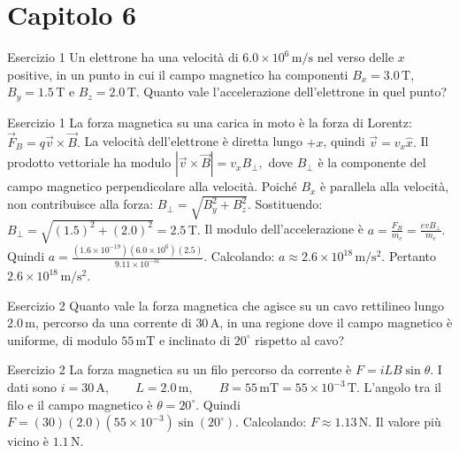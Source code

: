 \documentclass[a4paper]{article}
\begin{document}
\section{Capitolo 6}
\begin{snippetexercise}{Esercizio 1}
    Un elettrone ha una velocità di \(6.0 \times 10^6\,\mathrm{m/s}\) nel
    verso delle \(x\) positive, in un punto in cui il campo magnetico ha
    componenti \(B_x = 3.0\,\mathrm{T}\), \(B_y = 1.5\,\mathrm{T}\) e
    \(B_z = 2.0\,\mathrm{T}\). Quanto vale l'accelerazione dell'elettrone in
    quel punto?

\end{snippetexercise}
\begin{snippetsolution}{Esercizio 1}
    La forza magnetica su una carica in moto è la forza di Lorentz:
    \(\vec{F}_B = q\vec{v}\times\vec{B}.\)
    La velocità dell'elettrone è diretta lungo \(+x\), quindi
    \(\vec{v} = v_x \hat{x}.\)
    Il prodotto vettoriale ha modulo
    \(|\vec{v}\times\vec{B}| = v_x B_{\perp},\)
    dove \(B_{\perp}\) è la componente del campo magnetico perpendicolare alla
    velocità. Poiché \(B_x\) è parallela alla velocità, non contribuisce alla
    forza:
    \(B_{\perp} = \sqrt{B_y^2+B_z^2}.\)
    Sostituendo:
    \(B_{\perp} = \sqrt{(1.5)^2+(2.0)^2} = 2.5\,\mathrm{T}.\)
    Il modulo dell'accelerazione è
    \(a = \frac{F_B}{m_e} = \frac{e v B_{\perp}}{m_e}.\)
    Quindi
    \(a = \frac{ \left(1.6 \times 10^{-19}\right) \left(6.0 \times 10^6\right) (2.5) }{ 9.11 \times 10^{-31} }.\)
    Calcolando:
    \(a \approx 2.6 \times 10^{18}\,\mathrm{m/s^2}.\)
    Pertanto
    \(\boxed{2.6 \times 10^{18}\,\mathrm{m/s^2}}.\)
\end{snippetsolution}
\begin{snippetexercise}{Esercizio 2}
    Quanto vale la forza magnetica che agisce su un cavo rettilineo lungo
    \(2.0\,\mathrm{m}\), percorso da una corrente di \(30\,\mathrm{A}\), in una
    regione dove il campo magnetico è uniforme, di modulo \(55\,\mathrm{mT}\) e
    inclinato di \(20^\circ\) rispetto al cavo?

\end{snippetexercise}
\begin{snippetsolution}{Esercizio 2}
    La forza magnetica su un filo percorso da corrente è
    \(F = iLB\sin\theta.\)
    I dati sono
    \(i = 30\,\mathrm{A}, \qquad L = 2.0\,\mathrm{m}, \qquad B = 55\,\mathrm{mT} = 55 \times 10^{-3}\,\mathrm{T}.\)
    L'angolo tra il filo e il campo magnetico è
    \(\theta = 20^\circ.\)
    Quindi
    \(F = (30)(2.0) \left(55 \times 10^{-3}\right) \sin(20^\circ).\)
    Calcolando:
    \(F \approx 1.13\,\mathrm{N}.\)
    Il valore più vicino è
    \(\boxed{1.1\,\mathrm{N}}.\)
\end{snippetsolution}
\end{document}
